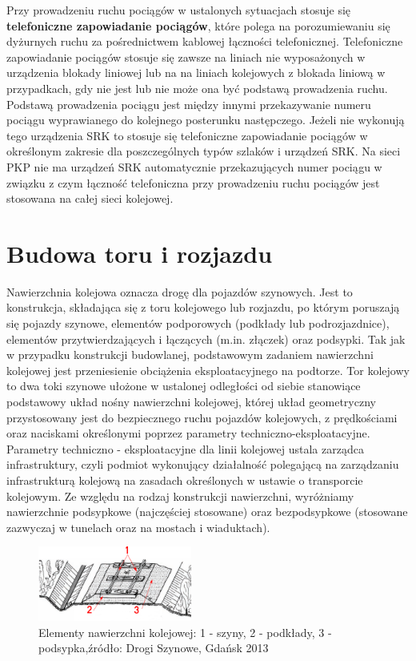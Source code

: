 Przy prowadzeniu ruchu pociągów w ustalonych sytuacjach stosuje się \textbf{telefoniczne zapowiadanie pociągów}, które polega na porozumiewaniu się dyżurnych ruchu za pośrednictwem kablowej łączności telefonicznej. Telefoniczne zapowiadanie pociągów stosuje się zawsze na liniach nie wyposażonych w urządzenia blokady liniowej lub na na liniach kolejowych z blokada liniową w przypadkach, gdy nie jest lub nie może ona być podstawą prowadzenia ruchu. Podstawą prowadzenia pociągu jest między innymi przekazywanie numeru pociągu wyprawianego do kolejnego posterunku następczego. Jeżeli nie wykonują tego urządzenia SRK to stosuje się telefoniczne zapowiadanie pociągów w określonym zakresie dla poszczególnych typów szlaków i urządzeń SRK. 
Na sieci PKP nie ma urządzeń SRK automatycznie przekazujących numer pociągu w związku z czym łączność telefoniczna przy prowadzeniu ruchu pociągów jest stosowana na całej sieci kolejowej.

\section{Budowa toru i rozjazdu}

Nawierzchnia kolejowa oznacza drogę dla pojazdów szynowych. Jest to konstrukcja, składająca się z toru kolejowego lub rozjazdu, po którym poruszają się pojazdy szynowe, elementów podporowych (podkłady lub podrozjazdnice), elementów przytwierdzających i łączących (m.in. złączek) oraz podsypki. Tak jak w przypadku konstrukcji budowlanej, podstawowym zadaniem nawierzchni kolejowej jest przeniesienie obciążenia eksploatacyjnego na podtorze.
Tor kolejowy to dwa toki szynowe ułożone w ustalonej odległości od siebie stanowiące podstawowy układ nośny nawierzchni kolejowej, której układ geometryczny przystosowany jest do bezpiecznego ruchu pojazdów kolejowych, z prędkościami oraz naciskami określonymi poprzez parametry techniczno-eksploatacyjne. Parametry techniczno - eksploatacyjne dla linii kolejowej ustala zarządca infrastruktury, czyli podmiot wykonujący działalność polegającą na zarządzaniu infrastrukturą kolejową na zasadach określonych w ustawie o transporcie kolejowym.
Ze względu na rodzaj konstrukcji nawierzchni, wyróżniamy nawierzchnie podsypkowe (najczęściej stosowane) oraz bezpodsypkowe (stosowane zazwyczaj w tunelach oraz na mostach i wiaduktach). 

\begin{figure}
	\includegraphics[width=0.45\textwidth]{skryptkierownik-img/budowa-toru.png}
	\caption{Elementy nawierzchni kolejowej: 1 - szyny, 2 - podkłady, 3 - podsypka,źródło: Drogi Szynowe, Gdańsk 2013}
	\label{fig:tory}
\end{figure}

